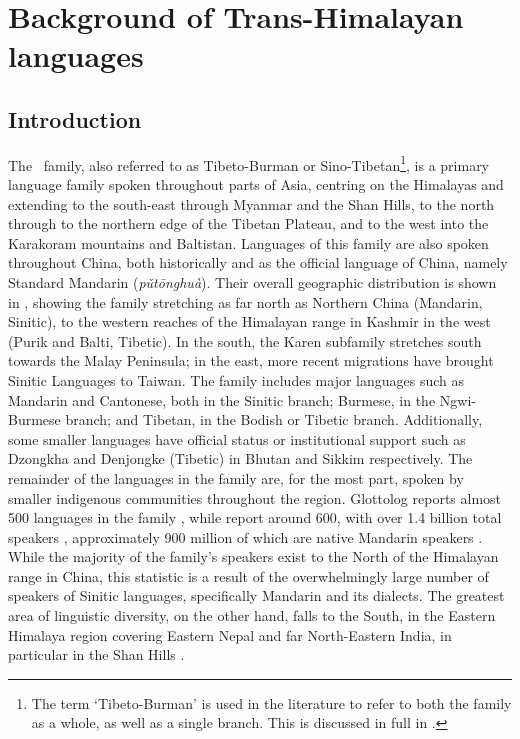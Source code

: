 \chapter{Background of Trans-Himalayan languages}\label{c:THOverview}

\section{Introduction}
The \lfam\ family, also referred to as Tibeto-Burman or Sino-Tibetan\footnote{The term `Tibeto-Burman' is used in the literature to refer to both the family as a whole, as well as a single branch. This is discussed in full in .}, is a primary language family spoken throughout parts of Asia, centring on the Himalayas and extending to the south-east through Myanmar and the Shan Hills, to the north through to the northern edge of the Tibetan Plateau, and to the west into the Karakoram mountains and Baltistan. Languages of this family are also spoken throughout China, both historically and as the official language of China, namely Standard Mandarin (\textit{pǔtōnghuà}). Their overall geographic distribution is shown in , showing the family stretching as far north as Northern China (Mandarin, Sinitic), to the western reaches of the Himalayan range in Kashmir in the west (Purik and Balti, Tibetic). In the south, the Karen subfamily stretches south towards the Malay Peninsula; in the east, more recent migrations have brought Sinitic Languages to Taiwan. The family includes major languages such as Mandarin and Cantonese, both in the Sinitic branch; Burmese, in the Ngwi-Burmese branch; and Tibetan, in the Bodish or Tibetic branch. Additionally, some smaller languages have official status or institutional support such as Dzongkha and Denjongke (Tibetic) in Bhutan and Sikkim respectively. The remainder of the languages in the family are, for the most part, spoken by smaller indigenous communities throughout the region. Glottolog reports almost 500 languages in the family \cite{glottolog}, while  report around 600, with over 1.4 billion total speakers \cite{ZhangH2020Baye}, approximately 900 million of which are native Mandarin speakers \cite{Ethnologue}. While the majority of the family's speakers exist to the North of the Himalayan range in China, this statistic is a result of the overwhelmingly large number of speakers of Sinitic languages, specifically Mandarin and its dialects. The greatest area of linguistic diversity, on the other hand, falls to the South, in the Eastern Himalaya region covering Eastern Nepal and far North-Eastern India, in particular in the Shan Hills \cite{BlenchPost2014}.

